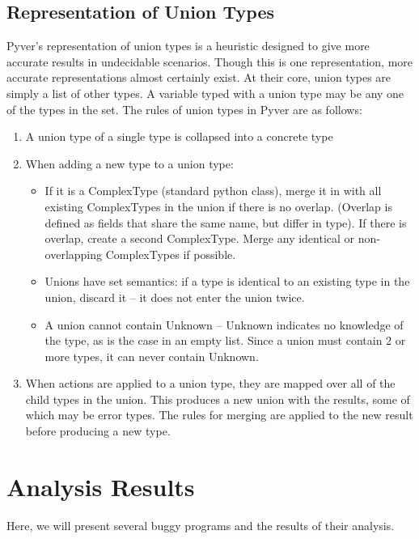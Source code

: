 \documentclass{article}[12pt]
\begin{document}
\subsection{Representation of Union Types}
Pyver's representation of union types is a heuristic designed to give more accurate results in undecidable
scenarios. Though this is one representation, more accurate representations almost certainly exist. At their core, union types are simply a list of other types. A variable typed with a union type may be any one
of the types in the set. The rules of union types in Pyver are as follows:
\begin{enumerate}
  \item A union type of a single type is collapsed into a concrete type
  \item When adding a new type to a union type: 
      \begin{itemize}
          \item If it is a ComplexType (standard python class), merge it in with all existing ComplexTypes in the union if
              there is no overlap. (Overlap is defined as fields that share the same name, but differ in type). If there
              is overlap, create a second ComplexType. Merge any identical or non-overlapping ComplexTypes if possible.
          \item Unions have set semantics: if a type is identical to an existing type in the union,
              discard it -- it does
              not enter the union twice.
          \item A union cannot contain Unknown -- Unknown indicates no knowledge of the type, as is the case in an empty
              list. Since a union must contain 2 or more types, it can never contain Unknown.
      \end{itemize}
  \item When actions are applied to a union type, they are mapped over all of the child types in the union. This
      produces a new union with the results, some of which may be error types. The rules for merging are
      applied to the new result before producing a new type.
\end{enumerate}



\section{Analysis Results}

Here, we will present several buggy programs and the results of their analysis.
\end{document}
